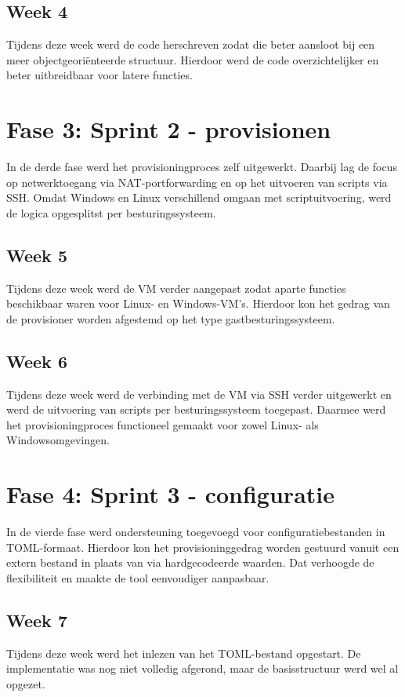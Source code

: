 \subsection{Week 4}
Tijdens deze week werd de code herschreven zodat die beter aansloot bij een meer objectgeoriënteerde structuur. Hierdoor werd de code overzichtelijker en beter uitbreidbaar voor latere functies.

\section{Fase 3: Sprint 2 - provisionen}
In de derde fase werd het provisioningproces zelf uitgewerkt. Daarbij lag de focus op netwerktoegang via NAT-portforwarding en op het uitvoeren van scripts via SSH. Omdat Windows en Linux verschillend omgaan met scriptuitvoering, werd de logica opgesplitst per besturingssysteem.

\subsection{Week 5}
Tijdens deze week werd de VM verder aangepast zodat aparte functies beschikbaar waren voor Linux- en Windows-VM's. Hierdoor kon het gedrag van de provisioner worden afgestemd op het type gastbesturingssysteem.

\subsection{Week 6}
Tijdens deze week werd de verbinding met de VM via SSH verder uitgewerkt en werd de uitvoering van scripts per besturingssysteem toegepast. Daarmee werd het provisioningproces functioneel gemaakt voor zowel Linux- als Windowsomgevingen.

\section{Fase 4: Sprint 3 - configuratie}
In de vierde fase werd ondersteuning toegevoegd voor configuratiebestanden in TOML-formaat. Hierdoor kon het provisioninggedrag worden gestuurd vanuit een extern bestand in plaats van via hardgecodeerde waarden. Dat verhoogde de flexibiliteit en maakte de tool eenvoudiger aanpasbaar.

\subsection{Week 7}
Tijdens deze week werd het inlezen van het TOML-bestand opgestart. De implementatie was nog niet volledig afgerond, maar de basisstructuur werd wel al opgezet.

